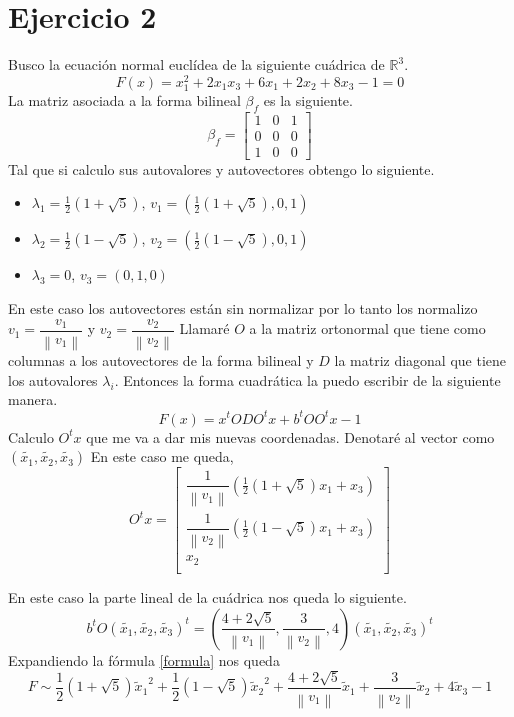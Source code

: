 \documentclass{article}
\newcommand{\norm}[1]{\left\lVert#1\right\rVert}
\newcommand{\ti}{\tilde}
\begin{document}
\bigskip


\section*{Ejercicio 2}
Busco la ecuación normal euclídea de la siguiente cuádrica de $\mathbb R ^3$. 
\[ F(x) = x_1 ^2 +2x_1 x_3 +6x_1 +2x_2 +8x_3 -1  = 0\]
La matriz asociada a la forma bilineal $\beta_f$ es la siguiente.
 \[ \beta_f =
 \begin{bmatrix}
 1 & 0 & 1  \\
 0 & 0 & 0 \\
 1 & 0 & 0
 \end{bmatrix}
 \]
Tal que si calculo sus autovalores y autovectores obtengo lo siguiente. 
\begin{itemize}
	\item $\lambda_1=\frac{1}{2} (1+\sqrt{5})$, $v_1= (\frac{1}{2}(1+\sqrt{5}),0,1)$ 
	\item $\lambda_2=\frac{1}{2} (1-\sqrt{5})$, $v_2= (\frac{1}{2}(1-\sqrt{5}),0,1)$
	\item $\lambda_3=0$, $v_3= (0,1,0)$
\end{itemize}
En este caso los autovectores están sin normalizar por lo tanto los normalizo $v_1 = \dfrac{v_1}{\norm{v_1}}$ y $v_2 = \dfrac{v_2}{\norm{v_2}}$
Llamaré $O$ a la matriz ortonormal que tiene como columnas a los autovectores de la forma bilineal y $D$ la matriz diagonal que tiene los autovalores $\lambda_i$. Entonces la forma cuadrática la puedo escribir de la siguiente manera.
\begin{equation}
\label{formula}
 F(x) = x^{t}ODO^{t}x + b^{t}OO^{t}x -1 
 \end{equation}
Calculo $O^{t}x$ que me va a dar mis nuevas coordenadas. Denotaré al vector como $(\tilde{x_1},\tilde{x_2},\tilde{x_3})$  En este caso me queda,
\[
O^tx = 
\begin{bmatrix}
\dfrac{1}{\norm{v_1}}(\frac{1}{2}(1+\sqrt{5})x_1 + x_3) \\
\dfrac{1}{\norm{v_2}}(\frac{1}{2}(1-\sqrt{5})x_1 + x_3) \\
x_2 \\
\end{bmatrix}
\]




En este caso  la parte lineal de la cuádrica nos queda lo siguiente.
\[b^tO(\tilde{x_1},\tilde{x_2},\tilde{x_3})^t = \left( \dfrac{4+2\sqrt{5}}{\norm{v_1}},\dfrac{3}{\norm{v_2}},4\right)(\tilde{x_1},\tilde{x_2},\tilde{x_3})^t \]
Expandiendo la fórmula \ref{formula} nos queda
\[ F \sim \frac{1}{2} (1+\sqrt{5}) {\ti x_1}^2 + \frac{1}{2} (1-\sqrt{5}){\ti x_2}^2 +\dfrac{4+2\sqrt{5}}{\norm{v_1}}{\ti x_1} + \dfrac{3}{\norm{v_2}}{\ti x_2} +4{\ti x_3} -1  \]
\end{document}
